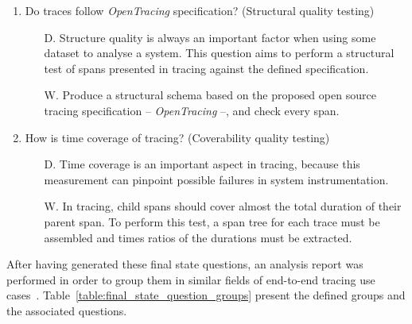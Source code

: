 \begin{enumerate}
    \item Do traces follow \emph{OpenTracing} specification? (Structural quality testing)
          \begin{itemize}
              \item[D.] Structure quality is always an important factor when using some dataset to analyse a system. This question aims to perform a structural test of spans presented in tracing against the defined specification.
              \item[W.] Produce a structural schema based on the proposed open source tracing specification -- \emph{OpenTracing} --, and check every span.
          \end{itemize}

    \item How is time coverage of tracing? (Coverability quality testing)
          \begin{itemize}
              \item[D.] Time coverage is an important aspect in tracing, because this measurement can pinpoint possible failures in system instrumentation.
              \item[W.] In tracing, child spans should cover almost the total duration of their parent span. To perform this test, a span tree for each trace must be assembled and times ratios of the durations must be extracted.
          \end{itemize}
\end{enumerate}


After having generated these final state questions, an analysis report was performed in order to group them in similar fields of end-to-end tracing use cases~\cite{Sambasivan2014}. Table~\ref{table:final_state_question_groups} present the defined groups and the associated questions.

